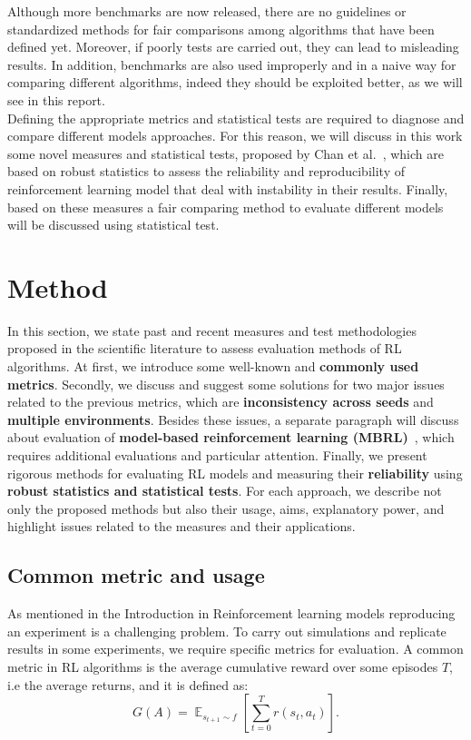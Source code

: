 \documentclass{article}
\DeclareMathOperator{\EX}{\mathbb{E}}%
\begin{document}
Although more benchmarks are now released, there are no guidelines or standardized methods for fair comparisons among algorithms that have been defined yet. Moreover, if poorly tests are carried out, they can lead to misleading results. In addition, benchmarks are also used improperly and in a naive way for comparing different algorithms, indeed they should be exploited better, as we will see in this report.\\
Defining the appropriate metrics and statistical tests are required to diagnose and compare different models approaches.
For this reason, we will discuss in this work some novel measures and statistical tests, proposed by Chan et al.~\cite{GoogleMeasure}, which are based on robust statistics to assess the reliability and reproducibility of reinforcement learning model that deal with instability in their results. Finally, based on these measures a fair comparing method to evaluate different models will be discussed using statistical test.
\section{Method}
In this section, we state past and recent measures and test methodologies proposed in the scientific literature to assess evaluation methods of RL algorithms. At first, we introduce some well-known and \textbf{commonly used metrics}. Secondly, we discuss and suggest some solutions for two major issues related to the previous metrics, which are \textbf{inconsistency across seeds} and \textbf{multiple environments}. Besides these issues, a separate paragraph will discuss about evaluation of \textbf{model-based reinforcement learning (MBRL)}~\cite{MBRL1}, which requires additional evaluations and particular attention. Finally, we present rigorous methods for evaluating RL models and measuring their \textbf{reliability} using \textbf{robust statistics and statistical tests}.
For each approach, we describe not only the proposed methods but also their usage, aims, explanatory power, and highlight issues related to the measures and their applications.
\subsection{Common metric and usage}
As mentioned in the Introduction in Reinforcement learning models reproducing an experiment is a challenging problem. To carry out simulations and replicate results in some experiments, we require specific metrics for evaluation.
A common metric in RL algorithms is the average cumulative reward over some episodes $T$, i.e the average returns, and it is defined as:	
\begin{equation}
G(A) = \EX_{s_{t+1} \sim f} \left[\sum_{t=0}^{T} r(s_t, a_t)\right].	
\end{equation}
\end{document}
